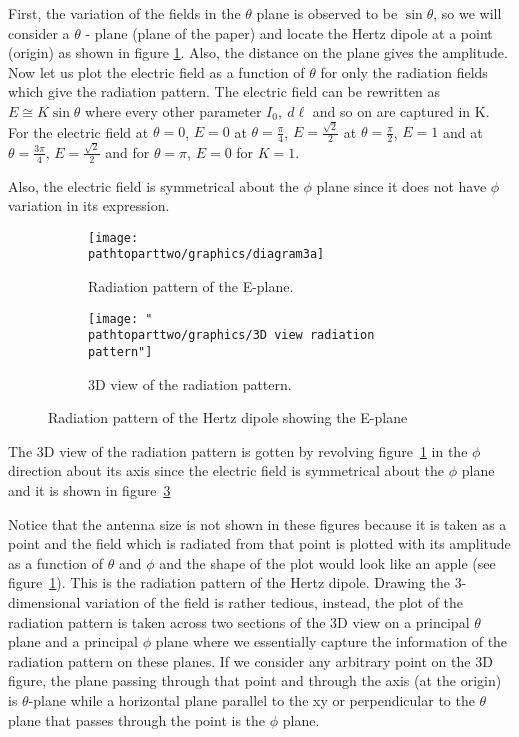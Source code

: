 First, the variation of the fields in the $\theta$ plane is observed to be $\sin\theta$, so we will consider a $\theta$ - plane (plane of the paper) and locate the Hertz dipole at a point (origin) as shown in figure \ref{fig:thetaplane}. Also, the distance on the plane gives the amplitude. Now let us plot the electric field as a function of $\theta$ for only the radiation fields which give the radiation pattern. The electric field can be rewritten as $E \cong K\sin\theta$ where every other parameter $I_0, \ d\ell$ and so on are captured in K. For the electric field at $\theta = 0$, $E=0$ at $\theta=\frac{\pi}{4}$, $E=\frac{\sqrt{2}}{2}$ at $\theta=\frac{\pi}{2}$, $E=1$ and at $\theta=\frac{3\pi}{4}$, $E=\frac{\sqrt{2}}{2}$ and for $\theta=\pi$, $E=0$ for $K=1$.

Also, the electric field is symmetrical about the $\phi$ plane since it does not have $\phi$ variation in its expression. 
\begin{figure}[h]
\centering
\begin{subfigure}[a]{0.8\linewidth}
\texttt{[image: \\pathtoparttwo/graphics/diagram3a]}
\caption{Radiation pattern of the E-plane.}
\label{fig:thetaplane}
\end{subfigure}
\hfill
\begin{subfigure}[b]{0.8\linewidth}
\texttt{[image: "\\pathtoparttwo/graphics/3D view radiation pattern"]}
\caption{3D view of the radiation pattern.}
\label{fig:3dview}
\end{subfigure}
\caption{Radiation pattern of the Hertz dipole showing the E-plane}
\end{figure}

The 3D view of the radiation pattern is gotten by revolving figure~\ref{fig:thetaplane} in the $\phi$ direction about its axis since the electric field is symmetrical about the $\phi$ plane and it is shown in figure~\ref{fig:3dview}

Notice that the antenna size is not shown in these figures because it is taken as a point and the field which is radiated from that point is plotted with its amplitude as a function of $\theta$ and $\phi$ and the shape of the plot would look like an apple (see figure~\ref{fig:thetaplane}). This is the radiation pattern of the Hertz dipole. Drawing the 3-dimensional variation of the field is rather tedious, instead, the plot of the radiation pattern is taken across two sections of the 3D view on a principal $\theta$ plane and a principal $\phi$ plane where we essentially capture the information of the radiation pattern on these planes. If we consider any arbitrary point on the 3D figure, the plane passing through that point and through the axis (at the origin) is $\theta$-plane while a horizontal plane parallel to the xy or perpendicular to the $\theta$ plane that passes through the point is the $\phi$ plane.

